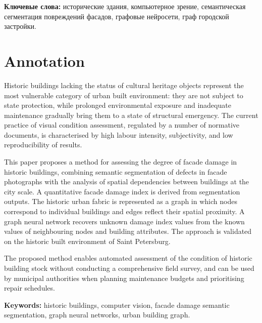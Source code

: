 \documentclass[14pt]{extarticle}
\begin{document}
\vspace{1.0em}
\noindent\textbf{Ключевые слова:} исторические здания, компьютерное зрение,
семантическая сегментация повреждений фасадов, графовые нейросети,
граф городской застройки.

\newpage

\section*{Annotation}
Historic buildings lacking the status of cultural heritage objects represent the most vulnerable category of urban built environment: they are not subject to state protection, while prolonged environmental exposure and inadequate maintenance gradually bring them to a state of structural emergency. The current practice of visual condition assessment, regulated by a number of normative documents, is characterised by high labour intensity, subjectivity, and low reproducibility of results.

This paper proposes a method for assessing the degree of facade damage in historic buildings, combining semantic segmentation of defects in facade photographs with the analysis of spatial dependencies between buildings at the city scale. A quantitative facade damage index is derived from segmentation outputs. The historic urban fabric is represented as a graph in which nodes correspond to individual buildings and edges reflect their spatial proximity. A graph neural network recovers unknown damage index values from the known values of neighbouring nodes and building attributes. The approach is validated on the historic built environment of Saint Petersburg.

The proposed method enables automated assessment of the condition of historic building stock without conducting a comprehensive field survey, and can be used by municipal authorities when planning maintenance budgets and prioritising repair schedules.

\vspace{1.0em}
\noindent\textbf{Keywords:} historic buildings, computer vision,
facade damage semantic segmentation, graph neural networks,
urban building graph.

\newpage

\tableofcontents
\newpage

\end{document}
